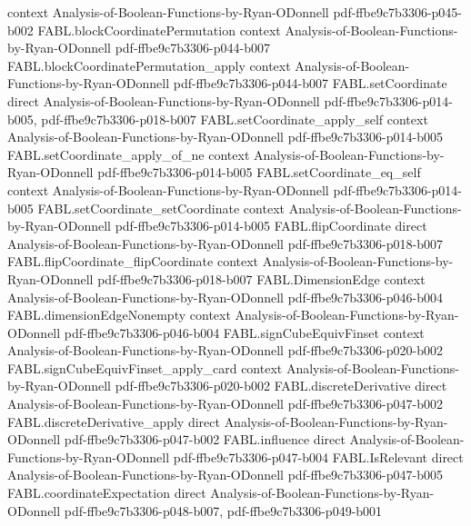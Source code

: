 \begin{theorem}
  {context}
  {Analysis-of-Boolean-Functions-by-Ryan-ODonnell}
  {pdf-ffbe9c7b3306-p045-b002}
\proofstep
  {FABL.blockCoordinatePermutation}
  {context}
  {Analysis-of-Boolean-Functions-by-Ryan-ODonnell}
  {pdf-ffbe9c7b3306-p044-b007}
\proofstep
  {FABL.blockCoordinatePermutation_apply}
  {context}
  {Analysis-of-Boolean-Functions-by-Ryan-ODonnell}
  {pdf-ffbe9c7b3306-p044-b007}
\proofstep
  {FABL.setCoordinate}
  {direct}
  {Analysis-of-Boolean-Functions-by-Ryan-ODonnell}
  {pdf-ffbe9c7b3306-p014-b005,
    pdf-ffbe9c7b3306-p018-b007}
\proofstep
  {FABL.setCoordinate_apply_self}
  {context}
  {Analysis-of-Boolean-Functions-by-Ryan-ODonnell}
  {pdf-ffbe9c7b3306-p014-b005}
\proofstep
  {FABL.setCoordinate_apply_of_ne}
  {context}
  {Analysis-of-Boolean-Functions-by-Ryan-ODonnell}
  {pdf-ffbe9c7b3306-p014-b005}
\proofstep
  {FABL.setCoordinate_eq_self}
  {context}
  {Analysis-of-Boolean-Functions-by-Ryan-ODonnell}
  {pdf-ffbe9c7b3306-p014-b005}
\proofstep
  {FABL.setCoordinate_setCoordinate}
  {context}
  {Analysis-of-Boolean-Functions-by-Ryan-ODonnell}
  {pdf-ffbe9c7b3306-p014-b005}
\proofstep
  {FABL.flipCoordinate}
  {direct}
  {Analysis-of-Boolean-Functions-by-Ryan-ODonnell}
  {pdf-ffbe9c7b3306-p018-b007}
\proofstep
  {FABL.flipCoordinate_flipCoordinate}
  {context}
  {Analysis-of-Boolean-Functions-by-Ryan-ODonnell}
  {pdf-ffbe9c7b3306-p018-b007}
\proofstep
  {FABL.DimensionEdge}
  {context}
  {Analysis-of-Boolean-Functions-by-Ryan-ODonnell}
  {pdf-ffbe9c7b3306-p046-b004}
\proofstep
  {FABL.dimensionEdgeNonempty}
  {context}
  {Analysis-of-Boolean-Functions-by-Ryan-ODonnell}
  {pdf-ffbe9c7b3306-p046-b004}
\proofstep
  {FABL.signCubeEquivFinset}
  {context}
  {Analysis-of-Boolean-Functions-by-Ryan-ODonnell}
  {pdf-ffbe9c7b3306-p020-b002}
\proofstep
  {FABL.signCubeEquivFinset_apply_card}
  {context}
  {Analysis-of-Boolean-Functions-by-Ryan-ODonnell}
  {pdf-ffbe9c7b3306-p020-b002}
\proofstep
  {FABL.discreteDerivative}
  {direct}
  {Analysis-of-Boolean-Functions-by-Ryan-ODonnell}
  {pdf-ffbe9c7b3306-p047-b002}
\proofstep
  {FABL.discreteDerivative_apply}
  {direct}
  {Analysis-of-Boolean-Functions-by-Ryan-ODonnell}
  {pdf-ffbe9c7b3306-p047-b002}
\proofstep
  {FABL.influence}
  {direct}
  {Analysis-of-Boolean-Functions-by-Ryan-ODonnell}
  {pdf-ffbe9c7b3306-p047-b004}
\proofstep
  {FABL.IsRelevant}
  {direct}
  {Analysis-of-Boolean-Functions-by-Ryan-ODonnell}
  {pdf-ffbe9c7b3306-p047-b005}
\proofstep
  {FABL.coordinateExpectation}
  {direct}
  {Analysis-of-Boolean-Functions-by-Ryan-ODonnell}
  {pdf-ffbe9c7b3306-p048-b007,
    pdf-ffbe9c7b3306-p049-b001}
\proofstep

\end{theorem}
